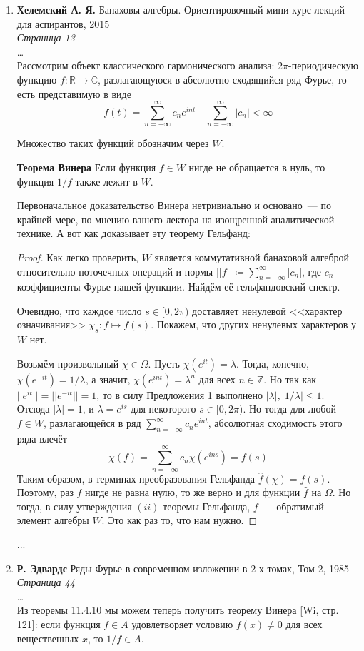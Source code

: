 \documentclass[12pt]{extarticle}
\theoremstyle{definition}
\begin{document}
    	\begin{enumerate}
			\item \textbf{Хелемский А. Я.} Банаховы алгебры. Ориентировочный мини-курс лекций для аспирантов, 2015\\
			\textit{Страница 13}\\
			\dots\\
			Рассмотрим объект классического гармонического анализа: $2\pi$-периодическую функцию $f:\mathbb{R}\rightarrow\mathbb{C}$, разлагающуюся в абсолютно сходящийся ряд Фурье, то есть представимую в виде
            $$f(t)=\sum_{n=-\infty}^\infty c_n e^{int}\quad \sum_{n=-\infty}^\infty |c_n|<\infty$$

            Множество таких функций обозначим через $W$.

			\textbf{Теорема Винера}
				Если функция $f\in W$ нигде не обращается в нуль, то функция $1/f$ также лежит в $W$.

				Первоначальное доказательство Винера нетривиально и основано~--- по крайней мере, по мнению вашего лектора на изощренной аналитической технике. А вот как доказывает эту теорему Гельфанд:
			\begin{proof}
				Как легко проверить, $W$ является коммутативной банаховой алгеброй относительно поточечных операций и нормы $||f||\coloneq\sum_{n=-\infty}^\infty |c_n|$, где $c_n$~--- коэффициенты Фурье нашей функции. Найдём её гельфандовский спектр.

				Очевидно, что каждое число $s\in[0,2\pi)$ доставляет ненулевой <<характер означивания>> $\chi_s:f\mapsto f(s)$. Покажем, что других ненулевых характеров у $W$ нет.

				Возьмём произвольный $\chi\in\Omega$. Пусть $\chi(e^{it})=\lambda$. Тогда, конечно, $\chi(e^{-it})=1/\lambda$, а значит, $\chi(e^{int})=\lambda^n$ для всех $n\in\mathbb{Z}$. Но так как $||e^{it}||=||e^{-it}||=1$, то в силу Предложения 1 выполнено $|\lambda|,|1/\lambda|\leq1$. Отсюда $|\lambda|=1$, и $\lambda=e^{is}$ для некоторого $s\in[0,2\pi)$. Но тогда для любой $f\in W$, разлагающейся в ряд $\sum_{n=-\infty}^\infty c_n e^{int}$, абсолютная сходимость этого ряда влечёт
				$$\chi(f)=\sum_{n=-\infty}^\infty c_n \chi(e^{ins})=f(s)$$
				Таким образом, в терминах преобразования Гельфанда $\hat{f}(\chi)=f(s)$. Поэтому, раз $f$ нигде не равна нулю, то же верно и для функции $\hat{f}$ на $\Omega$. Но тогда, в силу утверждения $(ii)$ теоремы Гельфанда, $f$~--- обратимый элемент алгебры $W$. Это как раз то, что нам нужно.
			\end{proof}
		...
		\item \textbf{Р. Эдвардс} Ряды Фурье в современном изложении в 2-х томах, Том 2, 1985\\
		\textit{Страница 44}\\
		\dots\\
		Из теоремы 11.4.10 мы можем теперь получить теорему Винера [Wi, стр. 121]: если функция $f\in A$ удовлетворяет условию $f(x)\neq 0$ для всех вещественных $x$, то $1/f\in A$.


\end{enumerate}
\end{document}
